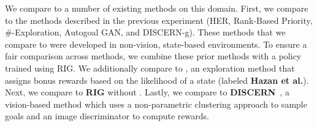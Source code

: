 We compare \METHOD to a number of existing methods on this domain.
First, we compare to the methods described in the previous experiment (HER, Rank-Based Priority, \#-Exploration, Autogoal GAN, and \mbox{DISCERN-g}).
These methods that we compare to were developed in non-vision, state-based environments.
To ensure a fair comparison across methods, we combine these prior methods with a policy trained using RIG.
We additionally compare to \citet{hazan2019provably}, an exploration method that assigns bonus rewards based on the likelihood of a state (labeled \textbf{Hazan et al.}).
Next, we compare to \textbf{RIG} without \METHOD.
Lastly, we compare to \textbf{DISCERN}~\citep{wardefarley2018discern}, a vision-based method which uses a non-parametric clustering approach to sample goals and an image discriminator to compute rewards.
\vspace{.5cm}
